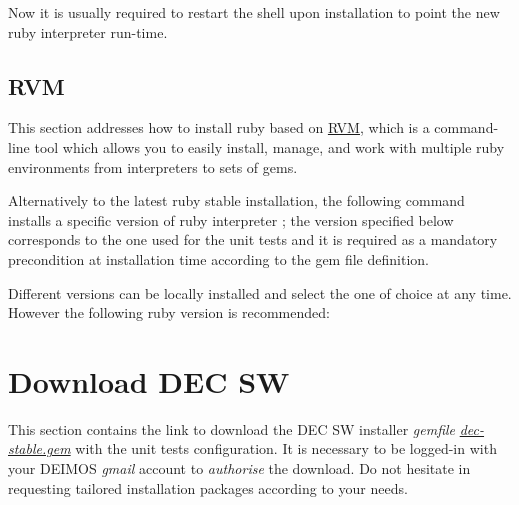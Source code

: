 \documentclass[dec_sum_main.tex]{subfiles}
\begin{document}
 \newline

\par
{}\newline

\par
\noindent
Now it is usually required to restart the shell upon  installation to point the new ruby interpreter run-time.

\subsection{RVM}
\par
\noindent
This section addresses how to install ruby based on \href{https://rvm.io/}{RVM}, which is a command-line tool which allows you to easily install, manage, and work with multiple ruby environments from interpreters to sets of gems. \newline

\par
{} \newline
\par 
\noindent
Alternatively to the latest ruby stable installation, the following command installs a specific version of ruby interpreter ; the version specified below corresponds to the one used for the unit tests and it is required as a mandatory precondition at installation time according to the gem file definition.\newline

\par 
\noindent
Different versions can be locally installed and select the one of choice at any time. However the following ruby version is recommended:

 \newline

 \newline



\section{Download DEC SW}
This section contains the link to download the DEC SW installer \textit{gemfile} \href{https://drive.google.com/uc?export=download&id=1gieDRpDEBzKv5Xr0qwPvBz34RHphTnQq}{\textit{dec-stable.gem}} with the unit tests configuration. It is necessary to be logged-in with your DEIMOS \textit{gmail} account to \textit{authorise} the download. Do not hesitate in requesting tailored installation packages according to your needs.
\end{document}
